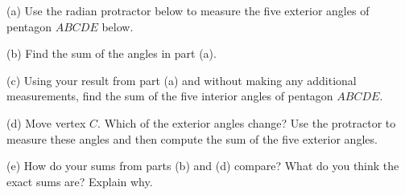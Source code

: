 \documentclass{ximera}
\begin{document}
\begin{exploration}  \label{Q111:Radians}
(a) Use the radian protractor below to measure the five exterior angles of pentagon $ABCDE$ below.

(b) Find the sum of the angles in part (a).

(c) Using your result from part (a) and without making any additional measurements, find the sum of the five interior angles of pentagon $ABCDE$.

(d) Move vertex $C$. Which of the exterior angles change? Use the protractor to measure these angles and then compute the sum of the five exterior angles.

(e) How do your sums from parts (b) and (d) compare? What do you think the exact sums are? Explain why.


 
\begin{onlineOnly}
    \begin{center}
\end{center}
\end{onlineOnly}
\end{exploration}
\end{document}
